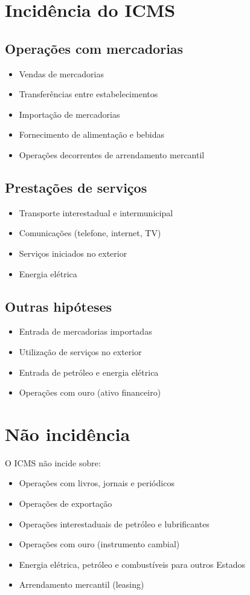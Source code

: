 \documentclass[12pt,a4paper]{article}
\begin{document}
\section{Incidência do ICMS}

\subsection{Operações com mercadorias}
\begin{itemize}
    \item Vendas de mercadorias
    \item Transferências entre estabelecimentos
    \item Importação de mercadorias
    \item Fornecimento de alimentação e bebidas
    \item Operações decorrentes de arrendamento mercantil
\end{itemize}

\subsection{Prestações de serviços}
\begin{itemize}
    \item Transporte interestadual e intermunicipal
    \item Comunicações (telefone, internet, TV)
    \item Serviços iniciados no exterior
    \item Energia elétrica
\end{itemize}

\subsection{Outras hipóteses}
\begin{itemize}
    \item Entrada de mercadorias importadas
    \item Utilização de serviços no exterior
    \item Entrada de petróleo e energia elétrica
    \item Operações com ouro (ativo financeiro)
\end{itemize}

\section{Não incidência}

O ICMS não incide sobre:
\begin{itemize}
    \item Operações com livros, jornais e periódicos
    \item Operações de exportação
    \item Operações interestaduais de petróleo e lubrificantes
    \item Operações com ouro (instrumento cambial)
    \item Energia elétrica, petróleo e combustíveis para outros Estados
    \item Arrendamento mercantil (leasing)
\end{itemize}
\end{document}
